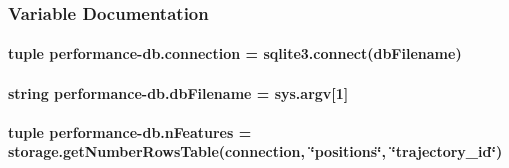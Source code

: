 \subsubsection{Variable Documentation}
\hypertarget{namespaceperformance-db_ad99932ac08836faca786064c2cc433ee}{
\paragraph[{connection}]{\setlength{\rightskip}{0pt plus 5cm}tuple performance-\/db.\-connection = sqlite3.\-connect({\bf db\-Filename})}}\label{namespaceperformance-db_ad99932ac08836faca786064c2cc433ee}
\hypertarget{namespaceperformance-db_a283e8388225ac72bea1f9a5b9b7f5ba9}{
\paragraph[{db\-Filename}]{\setlength{\rightskip}{0pt plus 5cm}string performance-\/db.\-db\-Filename = sys.\-argv\mbox{[}1\mbox{]}}}\label{namespaceperformance-db_a283e8388225ac72bea1f9a5b9b7f5ba9}
\hypertarget{namespaceperformance-db_a0de70b5896e44e6b32b6032bdce46af6}{
\paragraph[{n\-Features}]{\setlength{\rightskip}{0pt plus 5cm}tuple performance-\/db.\-n\-Features = {\bf storage.\-get\-Number\-Rows\-Table}({\bf connection}, \char`\"{}positions\char`\"{}, \char`\"{}trajectory\-\_\-id\char`\"{})}}\label{namespaceperformance-db_a0de70b5896e44e6b32b6032bdce46af6}
